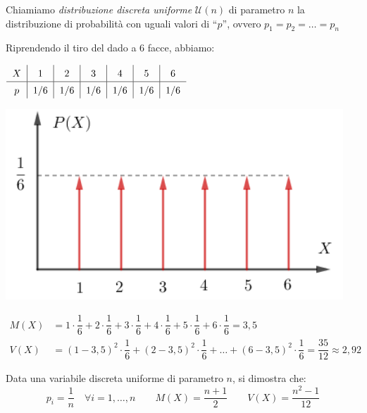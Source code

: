 \begin{definizione} Chiamiamo \emph{distribuzione discreta uniforme} $\mathcal{U}(n)$ di parametro $n$ la distribuzione di probabilità con uguali valori di ``$p$'', ovvero $p_1=p_2=\dots=p_n$
\end{definizione}
\begin{esempio} Riprendendo il tiro del dado a 6 facce, abbiamo:\\[4pt]
\begin{minipage}[c]{.6\textwidth}
\begin{center}
 \(\renewcommand\arraystretch{1.4}
\setlength\arraycolsep{22pt}
\begin{tabular}{c|c|c|c|c|c|c}
$X$ & 1 & 2 & 3 & 4& 5 &6\\
\hline
$p$ &1/6 & 1/6 &1/6 & 1/6 &1/6 & 1/6 \\
\end{tabular}\)
\end{center}

\end{minipage}
\begin{minipage}[c]{.4\textwidth}
\begin{center}
  \includegraphics[width=0.95\textwidth]{img/Uniforme_discr.png}
\end{center}
\end{minipage}
\[ \begin{split} M(X) &= 1 \cdot \dfrac{1}{6}+2 \cdot \dfrac{1}{6}+3 \cdot \dfrac{1}{6}+4 \cdot \dfrac{1}{6}+5 \cdot \dfrac{1}{6}+6 \cdot \dfrac{1}{6} = 3,5\\
V(X) &= (1-3,5)^2 \cdot \dfrac{1}{6}+(2-3,5)^2 \cdot \dfrac{1}{6}+\dots+(6-3,5)^2 \cdot \dfrac{1}{6} = \dfrac{35}{12} \approx 2,92  \end{split}\]

\begin{proprieta} Data una variabile discreta uniforme di parametro $n$, si dimostra che: 
\[\boxed{p_i = \dfrac{1}{n} \quad \forall i=1,\dots,n} \qquad \boxed{M(X) = \dfrac{n+1}{2}} \qquad \boxed{V(X) = \dfrac{n^2-1}{12}}\]
\end{proprieta}


\end{esempio}

